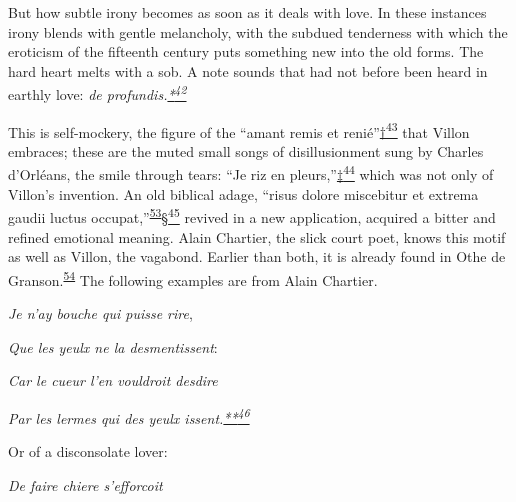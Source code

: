 But how subtle irony becomes as soon as it deals with love. In these
instances irony blends with gentle melancholy, with the
sub\protect\hypertarget{21_Chapter_Thirteen__IMAGE_AND_WORD.xhtmlux5cux23page_367}{}{}dued
tenderness with which the eroticism of the fifteenth century puts
something new into the old forms. The hard heart melts with a sob. A
note sounds that had not before been heard in earthly love: \emph{de
profundis.\protect\hypertarget{21_Chapter_Thirteen__IMAGE_AND_WORD.xhtmlux5cux23id_2869}{\protect\hyperlink{23_NOTES.xhtmlux5cux23id_2870}{*\textsuperscript{42}}}}

This is self-mockery, the figure of the ``amant remis et
renié''\protect\hypertarget{21_Chapter_Thirteen__IMAGE_AND_WORD.xhtmlux5cux23id_2867}{\protect\hyperlink{23_NOTES.xhtmlux5cux23id_2868}{†\textsuperscript{43}}}
that Villon embraces; these are the muted small songs of disillusionment
sung by Charles d'Orléans, the smile through tears: ``Je riz en
pleurs,''\protect\hypertarget{21_Chapter_Thirteen__IMAGE_AND_WORD.xhtmlux5cux23id_2865}{\protect\hyperlink{23_NOTES.xhtmlux5cux23id_2866}{‡\textsuperscript{44}}}
which was not only of Villon's invention. An old biblical adage, ``risus
dolore miscebitur et extrema gaudii luctus
occupat,''\textsuperscript{\protect\hypertarget{21_Chapter_Thirteen__IMAGE_AND_WORD.xhtmlux5cux23id_206}{\protect\hyperlink{23_NOTES.xhtmlux5cux23id_207}{53}}}\protect\hypertarget{21_Chapter_Thirteen__IMAGE_AND_WORD.xhtmlux5cux23id_2863}{\protect\hyperlink{23_NOTES.xhtmlux5cux23id_2864}{§\textsuperscript{45}}}
revived in a new application, acquired a bitter and refined emotional
meaning. Alain Chartier, the slick court poet, knows this motif as well
as Villon, the vagabond. Earlier than both, it is already found in Othe
de
Granson.\textsuperscript{\protect\hypertarget{21_Chapter_Thirteen__IMAGE_AND_WORD.xhtmlux5cux23id_204}{\protect\hyperlink{23_NOTES.xhtmlux5cux23id_205}{54}}}
The following examples are from Alain Chartier.

\emph{Je n'ay bouche qui puisse rire},

\emph{Que les yeulx ne la desmentissent}:

\emph{Car le cueur l'en vouldroit desdire}

\emph{Par les lermes qui des yeulx
issent.\protect\hypertarget{21_Chapter_Thirteen__IMAGE_AND_WORD.xhtmlux5cux23id_2861}{\protect\hyperlink{23_NOTES.xhtmlux5cux23id_2862}{**\textsuperscript{46}}}}

Or of a disconsolate lover:

\emph{De faire chiere s'efforcoit}

